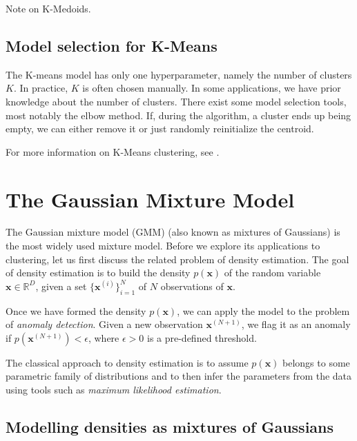 \documentclass[final,3p,times,twocolumn]{elsarticle}
\begin{document}
Note on K-Medoids.

\subsection{Model selection for K-Means}
The K-means model has only one hyperparameter, namely the number of clusters $K$.
In practice, $K$ is often chosen manually.
In some applications, we have prior knowledge about the number of clusters.
There exist some model selection tools, most notably the elbow method.
If, during the algorithm, a cluster ends up being empty, we can either remove it or just randomly reinitialize the centroid.

For more information on K-Means clustering, see \cite{Bishop}.


\section{The Gaussian Mixture Model}
The Gaussian mixture model (GMM) (also known as mixtures of Gaussians) is the most widely used mixture model.
Before we explore its applications to clustering, let us first discuss the related problem of density estimation.
The goal of density estimation is to build the density $p(\boldsymbol x)$ of the random variable $\boldsymbol x \in \mathbb{R}^D$, given a set $\{\boldsymbol x^{(i)}\}_{i=1}^N$ of $N$ observations of $\boldsymbol x$.

Once we have formed the density $p(\boldsymbol x)$, we can apply the model to the problem of \emph{anomaly detection}.
Given a new observation $\boldsymbol x^{(N+1)}$, we flag it as an anomaly if $p(\boldsymbol x^{(N+1)}) < \epsilon$, where $\epsilon > 0$ is a pre-defined threshold.

The classical approach to density estimation is to assume $p(\boldsymbol x)$ belongs to some parametric family of distributions and to then infer the parameters from the data using tools such as \emph{maximum likelihood estimation}. 

\subsection{Modelling densities as mixtures of Gaussians}
\end{document}
